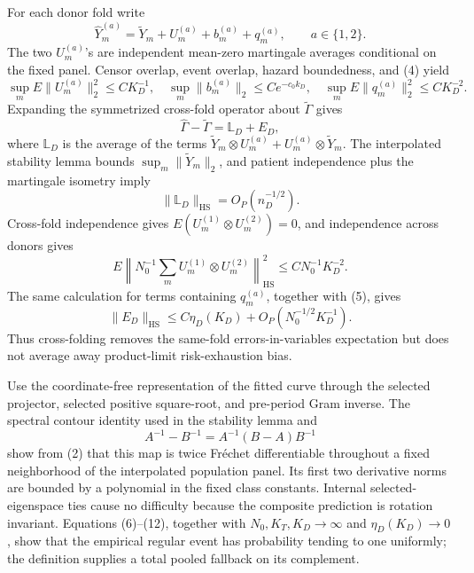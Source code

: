 For each donor fold write
\[
 \widehat Y_m^{(a)}=\widetilde Y_m+U_m^{(a)}+b_m^{(a)}+q_m^{(a)},
 \qquad a\in\{1,2\}. \tag{7}
\]
The two \(U_m^{(a)}\)'s are independent mean-zero martingale averages conditional on the fixed panel. Censor overlap, event overlap, hazard boundedness, and (4) yield
\[
 \sup_mE\|U_m^{(a)}\|_2^2\le CK_D^{-1},
 \quad
 \sup_m\|b_m^{(a)}\|_2\le Ce^{-c_0k_D},
 \quad
 \sup_mE\|q_m^{(a)}\|_2^2\le CK_D^{-2}. \tag{8}
\]
Expanding the symmetrized cross-fold operator about \(\widetilde\Gamma\) gives
\[
 \widehat\Gamma-\widetilde\Gamma=\mathbb L_D+E_D, \tag{9}
\]
where \(\mathbb L_D\) is the average of the terms \(\widetilde Y_m\otimes U_m^{(a)}+U_m^{(a)}\otimes\widetilde Y_m\). The interpolated stability lemma bounds \(\sup_m\|\widetilde Y_m\|_2\), and patient independence plus the martingale isometry imply
\[
 \|\mathbb L_D\|_{\mathrm{HS}}=O_P(n_D^{-1/2}). \tag{10}
\]
Cross-fold independence gives \(E(U_m^{(1)}\otimes U_m^{(2)})=0\), and independence across donors gives
\[
 E\left\|N_0^{-1}\sum_mU_m^{(1)}\otimes U_m^{(2)}\right\|_{\mathrm{HS}}^2
 \le CN_0^{-1}K_D^{-2}. \tag{11}
\]
The same calculation for terms containing \(q_m^{(a)}\), together with (5), gives
\[
 \|E_D\|_{\mathrm{HS}}
 \le C\eta_D(K_D)+O_P(N_0^{-1/2}K_D^{-1}). \tag{12}
\]
Thus cross-folding removes the same-fold errors-in-variables expectation but does not average away product-limit risk-exhaustion bias.

Use the coordinate-free representation of the fitted curve through the selected projector, selected positive square-root, and pre-period Gram inverse. The spectral contour identity used in the stability lemma and
\[
 A^{-1}-B^{-1}=A^{-1}(B-A)B^{-1} \tag{13}
\]
show from (2) that this map is twice Fr\'echet differentiable throughout a fixed neighborhood of the interpolated population panel. Its first two derivative norms are bounded by a polynomial in the fixed class constants. Internal selected-eigenspace ties cause no difficulty because the composite prediction is rotation invariant. Equations (6)--(12), together with \(N_0,K_T,K_D\to\infty\) and \(\eta_D(K_D)\to0\), show that the empirical regular event has probability tending to one uniformly; the definition supplies a total pooled fallback on its complement.

